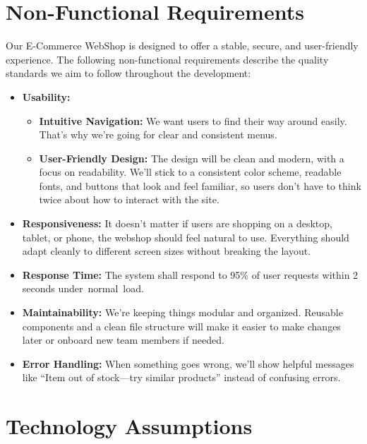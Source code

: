 \documentclass[a4paper,12pt]{article}
\begin{document}
	\section{Non-Functional Requirements}  

Our E-Commerce WebShop is designed to offer a stable, secure, and user-friendly experience. The following non-functional requirements describe the quality standards we aim to follow throughout the development:

\begin{itemize}
    \item \textbf{Usability:}  
    \begin{itemize}
        \item \textbf{Intuitive Navigation:}  
        We want users to find their way around easily. That’s why we’re going for clear and consistent menus.

        \item \textbf{User-Friendly Design:}  
        The design will be clean and modern, with a focus on readability. We’ll stick to a consistent color scheme, readable fonts, and buttons that look and feel familiar, so users don’t have to think twice about how to interact with the site.
    \end{itemize}

    \item \textbf{Responsiveness:}  
    It doesn't matter if users are shopping on a desktop, tablet, or phone, the webshop should feel natural to use. Everything should adapt cleanly to different screen sizes without breaking the layout.

    \item \textbf{Response Time:}  
    The system shall respond to 95\% of user requests within 2 seconds under normal load.

    \item \textbf{Maintainability:}  
    We’re keeping things modular and organized. Reusable components and a clean file structure will make it easier to make changes later or onboard new team members if needed.

    \item \textbf{Error Handling:}  
        When something goes wrong, we'll show helpful messages like “Item out of stock—try similar products” instead of confusing errors.
\end{itemize}

\section{Technology Assumptions}
\end{document}
